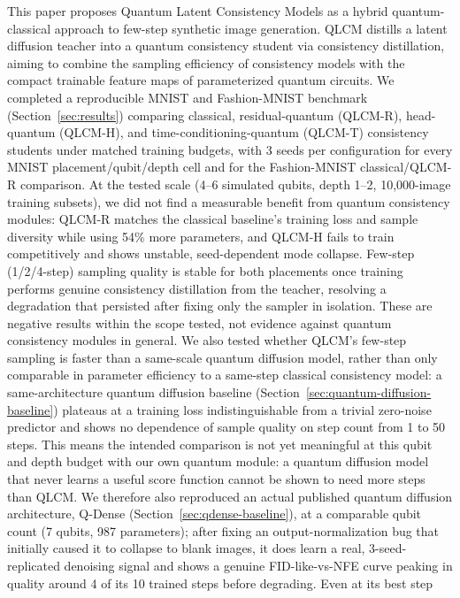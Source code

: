\documentclass[11pt]{article}
\begin{document}
This paper proposes Quantum Latent Consistency Models as a hybrid
quantum-classical approach to few-step synthetic image generation. QLCM
distills a latent diffusion teacher into a quantum consistency student via
consistency distillation, aiming to combine the sampling efficiency of
consistency models with the compact trainable feature maps of parameterized
quantum circuits. We completed a reproducible MNIST and Fashion-MNIST
benchmark (Section~\ref{sec:results}) comparing classical, residual-quantum (QLCM-R),
head-quantum (QLCM-H), and time-conditioning-quantum (QLCM-T) consistency
students under matched training budgets, with 3 seeds per configuration for
every MNIST placement/qubit/depth cell and for the Fashion-MNIST
classical/QLCM-R comparison. At the tested scale (4--6 simulated qubits,
depth 1--2, 10{,}000-image training subsets), we did not find a measurable
benefit from quantum consistency modules: QLCM-R matches the classical
baseline's training loss and sample diversity while using 54\% more
parameters, and QLCM-H fails to train competitively and shows unstable,
seed-dependent mode collapse. Few-step (1/2/4-step) sampling quality is
stable for both placements once training performs genuine consistency
distillation from the teacher, resolving a degradation that persisted after
fixing only the sampler in isolation. These are negative results within the
scope tested, not evidence against quantum consistency modules in general.
We also tested whether QLCM's few-step sampling is faster than a same-scale
quantum diffusion model, rather than only comparable in parameter efficiency
to a same-step classical consistency model: a same-architecture quantum
diffusion baseline (Section~\ref{sec:quantum-diffusion-baseline}) plateaus at
a training loss indistinguishable from a trivial zero-noise predictor and
shows no dependence of sample quality on step count from 1 to 50 steps. This
means the intended comparison is not yet meaningful at this qubit and depth
budget with our own quantum module: a quantum diffusion model that never
learns a useful score function cannot be shown to need more steps than QLCM.
We therefore also reproduced an actual published quantum diffusion
architecture, Q-Dense \citep{kolle2024qddm}
(Section~\ref{sec:qdense-baseline}), at a comparable qubit count (7 qubits,
987 parameters); after fixing an output-normalization bug that initially
caused it to collapse to blank images, it does learn a real, 3-seed-replicated
denoising signal and shows a genuine FID-like-vs-NFE curve peaking in quality
around 4 of its 10 trained steps before degrading. Even at its best step
\end{document}
